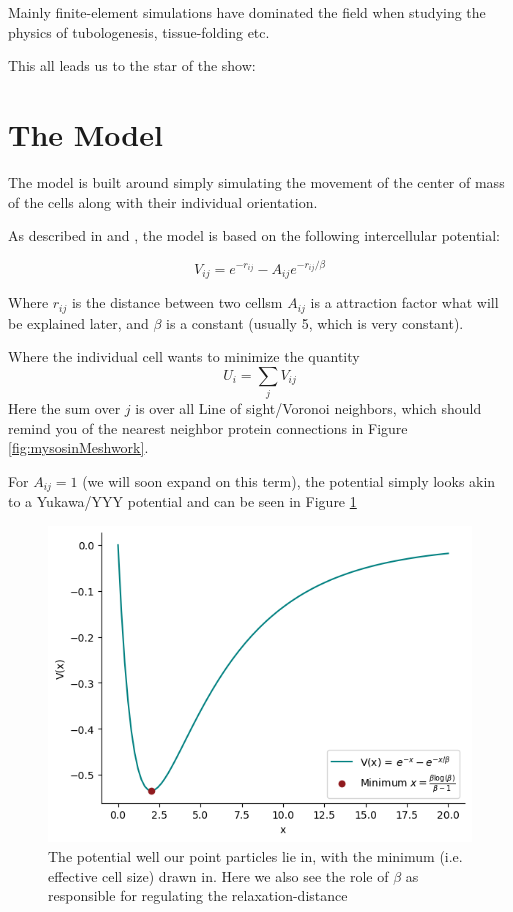Mainly finite-element simulations have dominated the field when studying the physics of tubologenesis, tissue-folding etc.  

This all leads us to the star of the show:

\section{The Model}
The model is built around simply simulating the movement of the center of mass of the cells along with their individual orientation. 

As described in \cite{} and \cite{}, the model is based on the following intercellular potential:

\begin{equation}
    V_{ij}=e^{-r_{ij}}-A_{ij}e^{-r_{ij}/\beta}
\end{equation}

Where $r_{ij}$ is the distance between two cellsm $A_{ij}$ is a attraction factor what will be explained later, and $\beta$ is a constant (usually 5, which is very constant). 

Where the individual cell wants to minimize the quantity 
\begin{equation}
    U_i = \sum_j V_{ij}
\end{equation}
Here the sum over $j$ is over all Line of sight/Voronoi neighbors, which should remind you of the nearest neighbor protein connections in Figure \ref{fig:mysosinMeshwork}. 


For $A_{ij}=1$ (we will soon expand on this term), the potential simply looks akin to a Yukawa/YYY potential and can be seen in Figure \ref{fig:potential} 
\begin{figure}[H]
    \centering
    \includegraphics[width=0.8\linewidth]{chapters/Theory/figures/potential.png}
    \caption{The potential well our point particles lie in, with the minimum (i.e. effective cell size) drawn in. Here we also see the role of $\beta$ as responsible for regulating the relaxation-distance}
    \label{fig:potential}
\end{figure}

